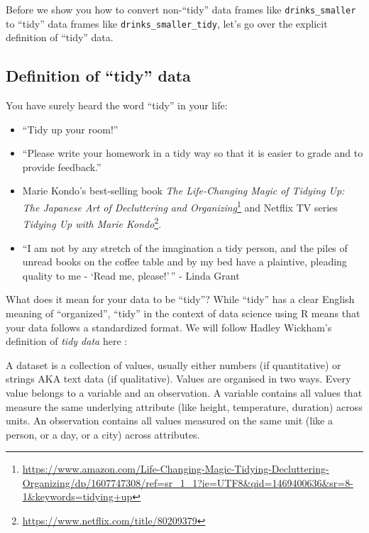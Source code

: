 \documentclass[12pt, krantz2,]{krantz}
\providecommand{\tightlist}{%
  \setlength{\itemsep}{0pt}\setlength{\parskip}{0pt}}
\renewenvironment{quote}{\begin{VF}}{\end{VF}}
\renewcommand{\href}[2]{#2\footnote{\url{#1}}}
\begin{document}
Before we show you how to convert non-``tidy'' data frames like \texttt{drinks\_smaller} to ``tidy'' data frames like \texttt{drinks\_smaller\_tidy}, let's go over the explicit definition of ``tidy'' data.

\hypertarget{definition-of-tidy-data}{%
\subsection{Definition of ``tidy'' data}\label{definition-of-tidy-data}}

You have surely heard the word ``tidy'' in your life:

\begin{itemize}
\tightlist
\item
  ``Tidy up your room!''
\item
  ``Please write your homework in a tidy way so that it is easier to grade and to provide feedback.''
\item
  Marie Kondo's best-selling book \href{https://www.amazon.com/Life-Changing-Magic-Tidying-Decluttering-Organizing/dp/1607747308/ref=sr_1_1?ie=UTF8\&qid=1469400636\&sr=8-1\&keywords=tidying+up}{\emph{The Life-Changing Magic of Tidying Up: The Japanese Art of Decluttering and Organizing}} and Netflix TV series \href{https://www.netflix.com/title/80209379}{\emph{Tidying Up with Marie Kondo}}.
\item
  ``I am not by any stretch of the imagination a tidy person, and the piles of unread books on the coffee table and by my bed have a plaintive, pleading quality to me - `Read me, please!'\,'' - Linda Grant
\end{itemize}

What does it mean for your data to be ``tidy''? While ``tidy'' has a clear English meaning of ``organized'', ``tidy'' in the context of data science using R means that your data follows a standardized format. We will follow Hadley Wickham's definition of \emph{tidy data} here \citep{tidy}:

\begin{quote}
A dataset is a collection of values, usually either numbers (if quantitative)
or strings AKA text data (if qualitative). Values are organised in two ways.
Every value belongs to a variable and an observation. A variable contains all
values that measure the same underlying attribute (like height, temperature,
duration) across units. An observation contains all values measured on the same
unit (like a person, or a day, or a city) across attributes.
\end{quote}
\end{document}
